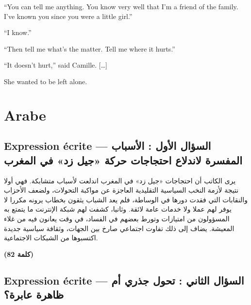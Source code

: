 \documentclass[11pt,a4paper]{article}
\begin{document}
``You can tell me anything. You know very well that I'm a friend of the family. I've known you since you were a little girl.''

``I know.''

``Then tell me what's the matter. Tell me where it hurts.''

``It doesn't hurt,'' said Camille. {[}\ldots{]}

She wanted to be left alone.

\hypertarget{arabe}{%
\section{Arabe}\label{arabe}}

\hypertarget{expression-uxe9crite-ux627ux644ux633ux624ux627ux644-ux627ux644ux623ux648ux644-ux627ux644ux623ux633ux628ux627ux628-ux627ux644ux645ux641ux633ux631ux629-ux644ux627ux646ux62fux644ux627ux639-ux627ux62dux62aux62cux627ux62cux627ux62a-ux62dux631ux643ux629-ux62cux64aux644-ux632ux62f-ux641ux64a-ux627ux644ux645ux63aux631ux628}{%
\subsection{Expression écrite --- السؤال الأول : الأسباب المفسرة لاندلاع احتجاجات حركة «جيل زد» في المغرب}\label{expression-uxe9crite-ux627ux644ux633ux624ux627ux644-ux627ux644ux623ux648ux644-ux627ux644ux623ux633ux628ux627ux628-ux627ux644ux645ux641ux633ux631ux629-ux644ux627ux646ux62fux644ux627ux639-ux627ux62dux62aux62cux627ux62cux627ux62a-ux62dux631ux643ux629-ux62cux64aux644-ux632ux62f-ux641ux64a-ux627ux644ux645ux63aux631ux628}}

يرى الكاتب أن احتجاجات «جيل زد» في المغرب اندلعت لأسباب متشابكة. فهي أولا نتيجة لأزمة النخب السياسية التقليدية العاجزة عن مواكبة التحولات، ولضعف الأحزاب والنقابات التي فقدت دورها في الوساطة، فلم يعد الشباب يثقون بخطاب يرونه مكررا لا يوفر لهم عملا ولا خدمات عامة لائقة. وثانيا، كشفت لهم شبكة الإنترنت ما يتمتع به المسؤولون من امتيازات وتورط بعضهم في الفساد، في وقت يعانون فيه من غلاء المعيشة. يضاف إلى ذلك تفاوت اجتماعي صارخ بين الجهات، وثقافة سياسية جديدة اكتسبوها من الشبكات الاجتماعية.

\textbf{(82 كلمة)}

\hypertarget{expression-uxe9crite-ux627ux644ux633ux624ux627ux644-ux627ux644ux62bux627ux646ux64a-ux62aux62dux648ux644-ux62cux630ux631ux64a-ux623ux645-ux638ux627ux647ux631ux629-ux639ux627ux628ux631ux629}{%
\subsection{Expression écrite --- السؤال الثاني : تحول جذري أم ظاهرة عابرة؟}\label{expression-uxe9crite-ux627ux644ux633ux624ux627ux644-ux627ux644ux62bux627ux646ux64a-ux62aux62dux648ux644-ux62cux630ux631ux64a-ux623ux645-ux638ux627ux647ux631ux629-ux639ux627ux628ux631ux629}}
\end{document}
